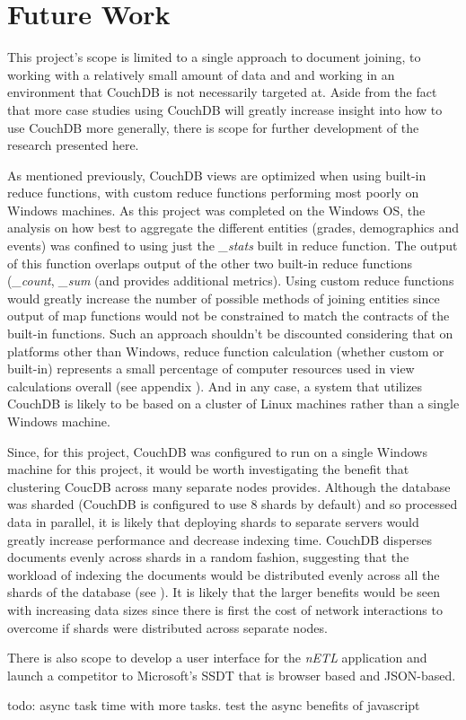 \section{Future Work}
This project's scope is limited to a single approach to document joining, to working with a relatively small amount of data and and working in an environment that CouchDB is not necessarily targeted at. Aside from the fact that more case studies using CouchDB will greatly increase insight into how to use CouchDB more generally, there is scope for further development of the research presented here.

As mentioned previously, CouchDB views are optimized when using built-in reduce functions, with custom reduce functions performing most poorly on Windows machines. As this project was completed on the Windows OS, the analysis on how best to aggregate the different entities (grades, demographics and events) was confined to using just the \textit{\_stats} built in reduce function. The output of this function overlaps output of the other two built-in reduce functions (\textit{\_count}, \textit{\_sum} (and provides additional metrics). Using custom reduce functions would greatly increase the number of possible methods of joining entities since output of map functions would not be constrained to match the contracts of the built-in functions. Such an approach shouldn't be discounted considering that on platforms other than Windows, reduce function calculation (whether custom or built-in) represents a small percentage of computer resources used in view calculations overall (see appendix \cite{slack1Nov}). And in any case, a system that utilizes CouchDB is likely to be based on a cluster of Linux machines rather than a single Windows machine.

Since, for this project, CouchDB was configured to run on a single Windows machine for this project, it would be worth investigating the benefit that clustering CoucDB across many separate nodes provides. Although the database was sharded (CouchDB is configured to use 8 shards by default) and so processed data in parallel, it is likely that deploying shards to separate servers would greatly increase performance and decrease indexing time. CouchDB disperses documents evenly across shards in a random fashion, suggesting that the workload of indexing the documents would be distributed evenly across all the shards of the database (see \cite{slack7Nov}). It is likely that the larger benefits would be seen with increasing data sizes since there is first the cost of network interactions to overcome if shards were distributed across separate nodes.

There is also scope to develop a user interface for the \textit{nETL} application and launch a competitor to Microsoft's SSDT that is browser based and JSON-based.


todo: async task time with more tasks. test the async benefits of javascript